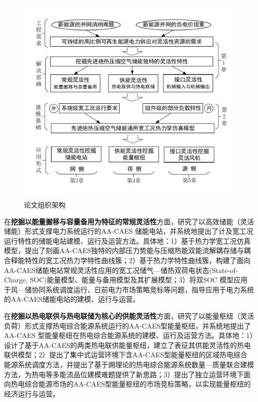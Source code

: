 \begin{figure}[H] %
  \centering
  \includegraphics[scale=0.75]{figures/Chap1-4-Thesis-Framework-3.pdf}
  \caption{论文组织架构}
  \label{fig:Thesis-Framework}
\end{figure}

在\textbf{挖掘以能量搬移与容量备用为特征的常规灵活性}方面，研究了以高效储能（灵活储能）形式支撑电力系统运行的AA-CAES 储能电站，并系统地提出了计及宽工况运行特性的储能电站建模、运行及运营方法。具体地：1）基于热力学宽工况仿真模型，提出了刻画AA-CAES独特的内部压力势能与压缩热能双能流解耦存储与耦合释能特性的宽工况热力学特性曲线簇；2）基于热力学特性曲线簇，构建了面向AA-CAES储能电站常规灵活性应用的宽工况储气—储热双荷电状态(State-of-Charge, SOC)能量模型、能量与备用模型及其扩展模型；3）将双SOC 模型应用于风—储协同系统调度运行、日前电力市场策略竞标等问题，指导应用于电力系统的AA-CAES储能电站的建模、运行与运营。

在\textbf{挖掘以热电联供与热电联储为核心的供能灵活性}方面，研究了以能量枢纽（灵活负荷）形式支撑热电综合能源系统运行的AA-CAES型能量枢纽，并系统地提出了AA-CAES 型能量枢纽在热电综合能源系统的建模、运行及运营方法。具体地：1）设计了基于AA-CAES的两类热电联供能量枢纽，建立了表征其供能灵活性的热电联供模型；2）提出了集中式运营环境下含AA-CAES型能量枢纽的区域热电综合能源系统调度方法，并提出了基于㶲理论的热电综合能源系统数量—质量联合建模方法，为热电等多能流品位建模难题提供了新思路；3）提出了独立运营环境下面向热电综合能源市场的AA-CAES型能量枢纽的市场竞标策略，以实现能量枢纽的经济运行与运营。

